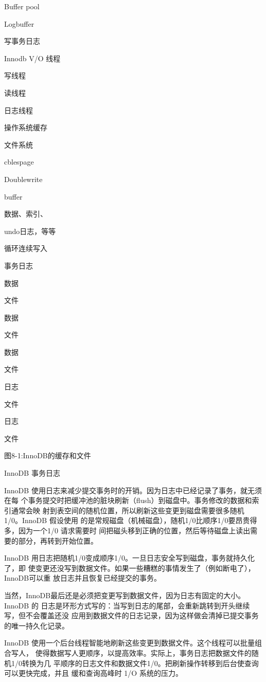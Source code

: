 Buffer pool

Logbuffer

写事务日志

Innodb V/O 线程

写线程

读线程

日志线程

操作系统缓存

文件系统

cblespage

Doublewrite

buffer

数据、索引、

undo日志，等等

循环连续写入

事务日志

数据

文件

数据

文件

数据

文件

日志

文件

日志

文件

图8-1:InnoDB的缓存和文件

InnoDB 事务日志

InnoDB 使用日志来减少提交事务时的开销。因为日志中已经记录了事务，就无须在每
个事务提交时把缓冲池的脏块刷新（flush）到磁盘中。事务修改的数据和索引通常会映
射到表空间的随机位置，所以刷新这些变更到磁盘需要很多随机 1/0。InnoDB 假设使用
的是常规磁盘（机械磁盘），随机1/0比顺序1/0要昂贵得多，因为一个1/0 请求需要时
间把磁头移到正确的位置，然后等待磁盘上读出需要的部分，再转到开始位置。

InnoDB 用日志把随机1/0变成顺序1/0。一旦日志安全写到磁盘，事务就持久化了，即
使变更还没写到数据文件。如果一些糟糕的事情发生了（例如断电了），InnoDB可以重
放日志并且恢复已经提交的事务。

当然，InnoDB最后还是必须把变更写到数据文件，因为日志有固定的大小。InnoDB 的
日志是环形方式写的：当写到日志的尾部，会重新跳转到开头继续写，但不会覆盖还没
应用到数据文件的日志记录，因为这样做会清掉已提交事务的唯一持久化记录。

InnoDB 使用一个后台线程智能地刷新这些变更到数据文件。这个线程可以批量组合写人，
使得数据写人更顺序，以提高效率。实际上，事务日志把数据文件的随机1/0转换为几
平顺序的日志文件和数据文件1/0。把刷新操作转移到后台使查询可以更快完成，并且
缓和查询高峰时 1/O 系统的压力。

